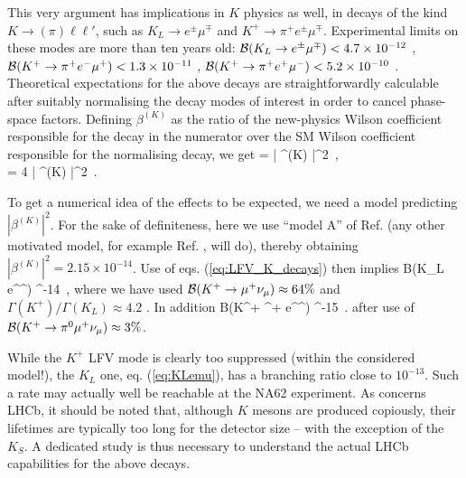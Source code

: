 This very argument has implications in $K$ physics as well, in decays of the kind $K \to (\pi) \ell \ell'$, such as $K_L \to e^\pm \mu^\mp$ and $K^+ \to \pi^+ e^\pm \mu^\mp$. Experimental limits on these modes are more than ten years old: $\mathcal B(K_L \rightarrow e^\pm \mu^\mp) < 4.7 \times 10^{-12}$ \cite{Ambrose:1998us}, $\mathcal B(K^+ \rightarrow \pi^+ e^- \mu^+) < 1.3 \times 10^{-11}$ \cite{Sher:2005sp}, $\mathcal B(K^+ \rightarrow \pi^+ e^+ \mu^-) < 5.2 \times 10^{-10}$ \cite{Appel:2000tc}. Theoretical expectations for the above decays are straightforwardly calculable after suitably normalising the decay modes of interest in order to cancel phase-space factors. Defining $\beta^{(K)}$ as the ratio of the new-physics Wilson coefficient responsible for the decay in the numerator over the SM Wilson coefficient responsible for the normalising decay, we get
\bea
\label{eq:LFV_K_decays}
 = | \beta^{(K)} |^2~, \\
\label{eq:LFV_K_decays_2}
 = 4 | \beta^{(K)} |^2~.
\eea

To get a numerical idea of the effects to be expected, we need a model predicting $|\beta^{(K)}|^2$. For the sake of definiteness, here we use ``model A'' of Ref. \cite{Guadagnoli:2015nra} (any other motivated model, for example Ref. \cite{Boucenna:2015raa}, will do), thereby obtaining $| \beta^{(K)} |^2 = 2.15 \times 10^{-14}$. Use of eqs. (\ref{eq:LFV_K_decays}) then implies
\be
\label{eq:KLemu}
\mc B(K_L \to e^\pm \mu^\mp)  ^{-14}~,
\ee
where we have used $\mathcal B(K^+ \rightarrow \mu^+ \nu_\mu) \approx 64\%$ and $\Gamma(K^+) / \Gamma(K_L) \approx 4.2$ \cite{Agashe:2014kda}. In addition
\be
\mc B(K^+ \to \pi^+ e^\pm \mu^\mp)  ^{-15}~.
\ee
after use of $\mathcal B(K^+ \rightarrow \pi^0 \mu^+ \nu_\mu) \approx 3\%$.

While the $K^+$ LFV mode is clearly too suppressed (within the considered model!), the $K_L$ one, eq. (\ref{eq:KLemu}), has a branching ratio close to $10^{-13}$. Such a rate may actually well be reachable at the NA62 experiment. As concerns LHCb, it should be noted that, although $K$ mesons are produced copiously, their lifetimes are typically too long for the detector size -- with the exception of the $K_S$. A dedicated study is thus necessary to understand the actual LHCb capabilities for the above decays.






%

